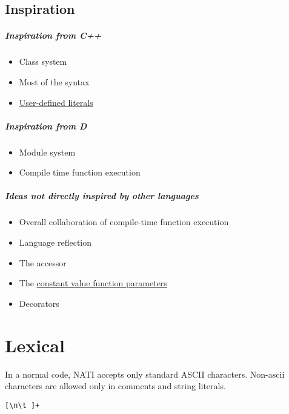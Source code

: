 \section{Inspiration}
\paragraph{Inspiration from C++}
\begin{itemize}
	\item Class system
	\item Most of the syntax
	\item \hyperref[userDefinedLiterals]{User-defined literals}
\end{itemize}

\paragraph{Inspiration from D}
\begin{itemize}
	\item Module system
	\item Compile time function execution
\end{itemize}

\paragraph{Ideas not directly inspired by other languages}
\begin{itemize}
	\item Overall collaboration of compile-time function execution
	\item Language reflection
	\item The \hyperref[colonAccessor]{\kwd{:}} accessor
	\item The \hyperref[constantValueParameter]{constant value function parameters}	
	\item Decorators
\end{itemize}

\chapter{Lexical}
In a normal code, NATI accepts only standard ASCII characters. Non-ascii characters are allowed only in comments and string literals.

\begin{grammar}
	 \verb|[\n\t ]+|
\end{grammar}

